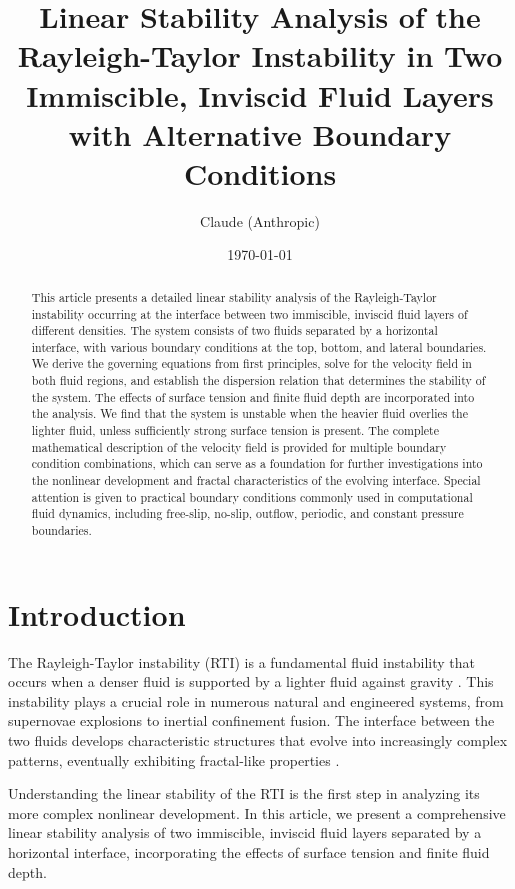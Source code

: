 \documentclass[12pt,a4paper]{article}
\title{Linear Stability Analysis of the Rayleigh-Taylor Instability in Two Immiscible, Inviscid Fluid Layers with Alternative Boundary Conditions}
\author{Claude (Anthropic)}
\date{\today}
\begin{document}
\maketitle

\begin{abstract}
    This article presents a detailed linear stability analysis of the Rayleigh-Taylor instability occurring at the interface between two immiscible, inviscid fluid layers of different densities. The system consists of two fluids separated by a horizontal interface, with various boundary conditions at the top, bottom, and lateral boundaries. We derive the governing equations from first principles, solve for the velocity field in both fluid regions, and establish the dispersion relation that determines the stability of the system. The effects of surface tension and finite fluid depth are incorporated into the analysis. We find that the system is unstable when the heavier fluid overlies the lighter fluid, unless sufficiently strong surface tension is present. The complete mathematical description of the velocity field is provided for multiple boundary condition combinations, which can serve as a foundation for further investigations into the nonlinear development and fractal characteristics of the evolving interface. Special attention is given to practical boundary conditions commonly used in computational fluid dynamics, including free-slip, no-slip, outflow, periodic, and constant pressure boundaries.
\end{abstract}

\section{Introduction}
The Rayleigh-Taylor instability (RTI) is a fundamental fluid instability that occurs when a denser fluid is supported by a lighter fluid against gravity \citep{rayleigh1882, taylor1950}. This instability plays a crucial role in numerous natural and engineered systems, from supernovae explosions to inertial confinement fusion. The interface between the two fluids develops characteristic structures that evolve into increasingly complex patterns, eventually exhibiting fractal-like properties \citep{sharp1984, youngs1991}.

Understanding the linear stability of the RTI is the first step in analyzing its more complex nonlinear development. In this article, we present a comprehensive linear stability analysis of two immiscible, inviscid fluid layers separated by a horizontal interface, incorporating the effects of surface tension and finite fluid depth.
\end{document}

